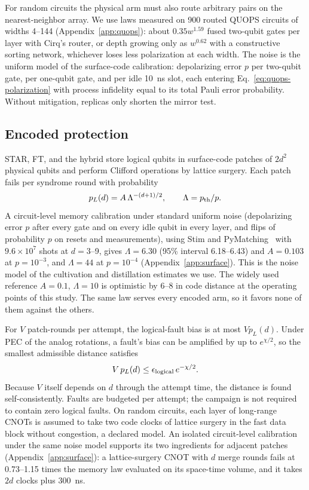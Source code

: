 \documentclass[11pt]{article}
\newcommand{\eps}{\epsilon}
\begin{document}
For random circuits the physical arm must also route arbitrary pairs on the
nearest-neighbor array. We use laws measured on 900 routed QUOPS circuits of
widths 4--144 (Appendix~\ref{app:quops}): about $0.35w^{1.59}$ fused two-qubit
gates per layer with Cirq's router, or depth growing only as $w^{0.62}$ with a
constructive sorting network, whichever loses less polarization at each width.
The noise is the uniform model of the surface-code calibration: depolarizing
error $p$ per two-qubit gate, per one-qubit gate, and per idle 10~ns slot, each
entering Eq.~\eqref{eq:quops-polarization} with process
infidelity equal to its total Pauli error probability. Without mitigation,
replicas only shorten the mirror test.

\subsection{Encoded protection}\label{sec:encoded}
STAR, FT, and the hybrid store logical qubits in surface-code patches of
$2d^2$ physical qubits and perform Clifford operations by lattice surgery.
Each patch fails per syndrome round with probability
\begin{equation}\label{eq:logical}
 p_L(d)=A\,\Lambda^{-(d+1)/2},\qquad \Lambda=p_{\rm th}/p.
\end{equation}
A circuit-level memory calibration under standard uniform noise (depolarizing
error $p$ after every gate and on every idle qubit in every layer, and flips of
probability $p$ on resets and measurements), using Stim and
PyMatching~\cite{gidney2021stim,higgott2023sparse} with $9.6\times10^7$ shots at
$d=3$--9, gives $\Lambda=6.30$ (95\% interval 6.18--6.43) and $A=0.103$ at
$p=10^{-3}$, and $\Lambda=44$ at $p=10^{-4}$ (Appendix~\ref{app:surface}). This is
the noise model of the cultivation and distillation estimates we use. The widely
used reference $A=0.1$, $\Lambda=10$ is optimistic by 6--8 in code distance at the
operating points of this study. The same law serves every encoded arm, so it favors none
of them against the others.

For $V$ patch-rounds per attempt, the logical-fault bias is at most $Vp_L(d)$.
Under PEC of the analog rotations, a fault's bias can be amplified by up to
$e^{\chi/2}$, so the smallest admissible distance satisfies
\begin{equation}\label{eq:distance}
 V\,p_L(d)\leq\eps_{\rm logical}\,e^{-\chi/2}.
\end{equation}
Because $V$ itself depends on $d$ through the attempt time, the distance is
found self-consistently. Faults are budgeted per attempt; the campaign is not
required to contain zero logical faults. On random circuits, each layer of
long-range CNOTs is assumed to take two code clocks of lattice surgery in the
fast data block without congestion, a declared model. An isolated circuit-level
calibration under the same noise model supports its two ingredients for
adjacent patches (Appendix~\ref{app:surface}): a lattice-surgery CNOT with
$d$ merge rounds fails at 0.73--1.15 times the memory law evaluated on its
space-time volume, and it takes $2d$ clocks plus 300~ns.
\end{document}
